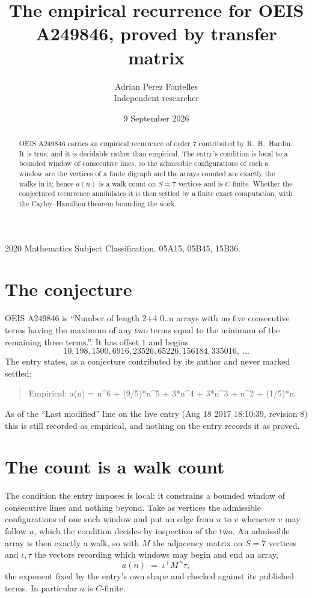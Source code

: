 \documentclass[11pt,a4paper]{article}
\title{The empirical recurrence for OEIS A249846, proved by transfer matrix}
\author{Adrian Perez Fontelles\\ \small Independent researcher}
\date{9 September 2026}
\theoremstyle{plain}
\theoremstyle{definition}
\begin{document}
\maketitle

\begin{abstract}
OEIS A249846 carries an empirical recurrence of order $7$ contributed by R.~H.~Hardin. It is
true, and it is decidable rather than empirical. The entry's condition is local to a bounded window of consecutive lines, so
the admissible configurations of such a window are the vertices of a finite digraph and the
arrays counted are exactly the walks in it; hence $a(n)$ is a walk count on $S=7$ vertices
and is $C$-finite. Whether the conjectured recurrence annihilates it is then settled by a
finite exact computation, with the Cayley--Hamilton theorem bounding the work.
\end{abstract}

\noindent\small 2020 Mathematics Subject Classification. 05A15, 05B45, 15B36.\normalsize

\section{The conjecture}

OEIS A249846 is ``Number of length 2+4 0..n arrays with no five consecutive terms having the maximum of any two terms equal to the minimum of the remaining three terms.''. It has offset $1$ and begins
\[
10, 198, 1500, 6916, 23526, 65226, 156184, 335016,\ \dots
\]
The entry states, as a conjecture contributed by its author and never marked settled:
\begin{quote}
Empirical: a(n) = n\^{}6 + (9/5)*n\^{}5 + 3*n\^{}4 + 3*n\^{}3 + n\^{}2 + (1/5)*n.
\end{quote}
As of the ``Last modified'' line on the live entry (Aug 18 2017 18:10:39, revision 8) this is still
recorded as empirical, and nothing on the entry records it as proved.

\section{The count is a walk count}

The condition the entry imposes is local: it constrains a bounded window of consecutive lines and nothing beyond. Take as
vertices the admissible configurations of one such window and put an edge from $u$ to $v$
whenever $v$ may follow $u$, which the condition decides by inspection of the two. An
admissible array is then exactly a walk, so with $M$ the adjacency matrix on $S=7$ vertices
and $\iota,\tau$ the vectors recording which windows may begin and end an array,
\[
a(n)\;=\;\iota^{\!\top}M^{\,n}\tau ,
\]
the exponent fixed by the entry's own shape and checked against its published terms. In
particular $a$ is $C$-finite.
\end{document}
